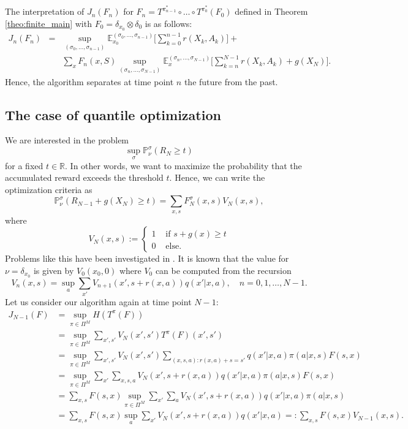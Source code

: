 \documentclass[reqno, 12pt]{amsart}%
\newcommand{\R}{\mathbb{R}} %
\newcommand{\PP}{\mathbb{P}}
\newcommand{\EE}{\mathbb{E}}
\theoremstyle{definition}
\numberwithin{equation}{section} \numberwithin{theorem}{section}
\begin{document}
The interpretation of $J_n(F_n)$  for $F_n=T^{\pi_{n-1}^*}\circ\ldots\circ T^{\pi_{0}^*}
(F_0)$ defined in Theorem \ref{theo:finite_main} 
with $F_0 = \delta_{x_0}\otimes\delta_0$ is as follows:
\begin{eqnarray*}
 J_n(F_n) &=& \sup_{(\sigma_0,\ldots,\sigma_{n-1})} \EE_{x_0}^{(\sigma_0,\ldots,\sigma_{n-1})}\Big[\sum_{k=0}^{n-1}r(X_k,A_k)\Big]+
\\
&&\sum_x F_n(x,S)  \sup_{(\sigma_n,\ldots,\sigma_{N-1})} \EE_{x}^{(\sigma_n,\ldots,\sigma_{N-1})}\Big[\sum_{k=n}^{N-1}r(X_k,A_k) + g(X_N)\Big].
\end{eqnarray*}
Hence, the algorithm separates at time point $n$ the future from the past.

\subsection{The case of quantile optimization}
 We are interested in the problem
 $$\sup_\sigma \PP^\sigma_\nu(R_{N}\ge t)$$
 for a fixed $t\in\R$. In other words, we want to maximize the probability that the accumulated reward exceeds the threshold $t.$ Hence, we can write the optimization criteria as  $$ \PP^\sigma_\nu(R_{N-1}+g(X_N)\ge t)= \sum_{x,s} F_N^\sigma(x,s) V_N(x,s),$$ where
 $$ V_N(x,s):= \left\{ \begin{array}{cl}
    1  & \mbox{ if } s+g(x)\ge t  \\
    0  & \mbox{ else. }
 \end{array}\right.$$
Problems like this have been investigated in \cite{filar1995percentile,wu1999minimizing,bauerle2011markov,chow2015risk,gilbert2017optimizing,li2022quantile}.
 It is known that the value for $\nu=\delta_{x_0}$ is given by $V_0(x_0,0)$ where $V_0$ can be computed from the recursion 
\begin{equation}\label{eq:quantile_rec}
    V_n(x,s) = \sup_a  \sum_{x'} V_{n+1}(x',s+r(x,a))q(x'|x,a), \quad n=0,1,\ldots,N-1.
\end{equation} 
Let us consider our algorithm again at time point $N-1:$
\begin{align*}
J_{N-1}(F) & = \sup_{\pi\in \Pi^M} H(T^\pi(F))  \\
&= \sup_{\pi\in \Pi^M}   \sum_{x',s'} 
V_N(x',s') T^\pi(F)(x',s')\\
&= \sup_{\pi\in \Pi^M}   \sum_{x',s'} 
V_N(x',s')   \sum_{(x,s,a) :  r(x,a)+s= s'} 
q(x'|x,a)  \pi(a|x,s) F(s,x)\\
&= \sup_{\pi\in \Pi^M}   \sum_{x'} 
\sum_{x,s,a} V_N(x',s+r(x,a))    q(x'|x,a)  
\pi(a|x,s) F(s,x)\\
&=  \sum_{x,s} F(s,x) \sup_{\pi\in \Pi^M}  
\sum_{x'}\sum_a  V_N(x',s+r(x,a))q(x'|x,a)  
\pi(a|x,s) \\
&=  \sum_{x,s} F(s,x) \sup_{a}   \sum_{x'} 
V_N(x',s+r(x,a))    q(x'|x,a) =:  
\sum_{x,s} F(s,x) V_{N-1}(x,s).
 \end{align*}  
\end{document}
